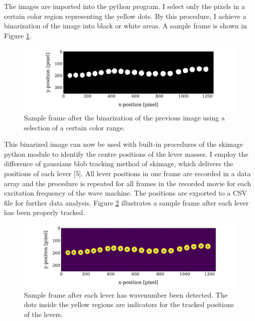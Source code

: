 \documentclass[12pt]{article}
\begin{document}
The images are imported into the python program. I select only the pixels in a certain color region representing the yellow dots. By this procedure, I achieve a binarization of the image into black or white areas. A sample frame is shown in Figure \ref{fig:binary}.
\begin{figure}[hbt]
  \includegraphics[width=.8\columnwidth]{analysis/colour_channel_adjustment}
  \caption{Sample frame after the binarization of the previous image using a selection of a certain color range.} \label{fig:binary}
\end{figure}
This binarized image can now be used with built-in procedures of the skimage python module to identify the centre positions of the lever masses. I employ the difference of gaussians blob tracking method of skimage, which delivers the positions of each lever [5]. All lever positions in one frame are recorded in a data array and the procedure is repeated for all frames in the recorded movie for each excitation frequency of the wave machine.  The positions are exported to a CSV file for further data analysis. Figure \ref{fig:tracked} illustrates a sample frame after each lever has been properly tracked.
\begin{figure}[hbt]
  \includegraphics[width=.8\columnwidth]{analysis/blob_tracking}
  \caption{Sample frame after each lever has wavenumber been detected. The dots inside the yellow regions are indicators for the tracked positions of the levers.}\label{fig:tracked}
\end{figure}
\end{document}
